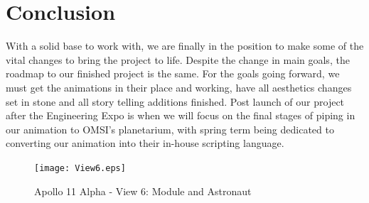 \documentclass[onecolumn, draftclsnofoot,10pt, compsoc]{IEEEtran}
\begin{document}
\section{Conclusion}
With a solid base to work with, we are finally in the position to make some of the vital changes to bring the project to life. Despite the change in main goals, the roadmap to our finished project is the same. For the goals going forward, we must get the animations in their place and working, have all aesthetics changes set in stone and all story telling additions finished. Post launch of our project after the Engineering Expo is when we will focus on the final stages of piping in our animation to OMSI's planetarium, with spring term being dedicated to converting our animation into their in-house scripting language. 

\begin{figure}
    \texttt{[image: View6.eps]}
    \caption{Apollo 11 Alpha - View 6: Module and Astronaut}
    \label{fig:View 6}
\end{figure}
\end{document}
